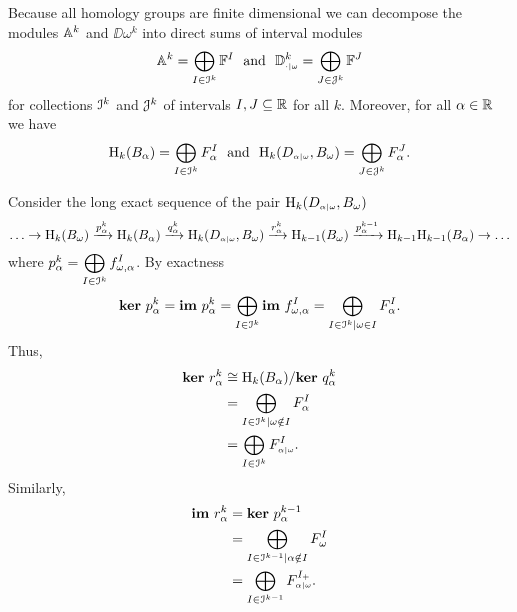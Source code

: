 Because all homology groups are finite dimensional we can decompose the modules $\AA^k$ and $\DD{\omega}^k$ into direct sums of interval modules
\[ \AA^k = \bigoplus_{I\in\I^k} \FF^I\ \text{ and }\ \DD{\omega}^k = \bigoplus_{J\in\J^k} \FF^J\]
for collections $\I^k$ and $\J^k$ of intervals $I,J\subseteq \R$ for all $k$.
Moreover, for all $\alpha\in\R$ we have
\[ \hom_k(B_\alpha) = \bigoplus_{I\in \I^k}F_\alpha^I\ \text{ and }\ \hom_k(D\subi{\omega}{\alpha}, B_\omega) = \bigoplus_{J\in\J^k} F_\alpha^J.\]

Consider the long exact sequence of the pair $\hom_k(D\subi{\omega}{\alpha}, B_\omega)$
\[ \ldots\to \hom_k(B_\omega)\xrightarrow{p_\alpha^k} \hom_k(B_\alpha)\xrightarrow{q_\alpha^k}\hom_k(D\subi{\omega}{\alpha}, B_\omega)\xrightarrow{r_\alpha^k} \hom_{k-1}(B_\omega)\xrightarrow{p_\alpha^{k-1}}\hom_{k-1}\hom_{k-1}(B_\alpha)\to\ldots\]
where $p_\alpha^k = \displaystyle\bigoplus_{I\in\I^k} f_{\omega,\alpha}^I$.
By exactness %
\[\ker~p_\alpha^k = \im~p_\alpha^k = \bigoplus_{I\in\I^k}\im~f_{\omega,\alpha}^I = \bigoplus_{I\in\I^k \mid \omega\in I} F_\alpha^I.\]
Thus,
\begin{align*}
  \ker~r_\alpha^k &\cong \hom_k(B_\alpha) / \ker~q_\alpha^k\\
    &= \bigoplus_{I\in \I^k\mid \omega\notin I} F_\alpha^I\\
    &= \bigoplus_{I\in\I^k} F\subi{\omega}{\alpha}^I.
\end{align*}
Similarly,
\begin{align*} \im~r_\alpha^k &= \ker~p_\alpha^{k-1}\\
  &= \bigoplus_{I\in\I^{k-1}\mid \alpha\notin I} F_\omega^I\\ %
  &= \bigoplus_{I\in\I^{k-1}} F\subi{\omega}{\alpha}^{I_+}.
\end{align*}


